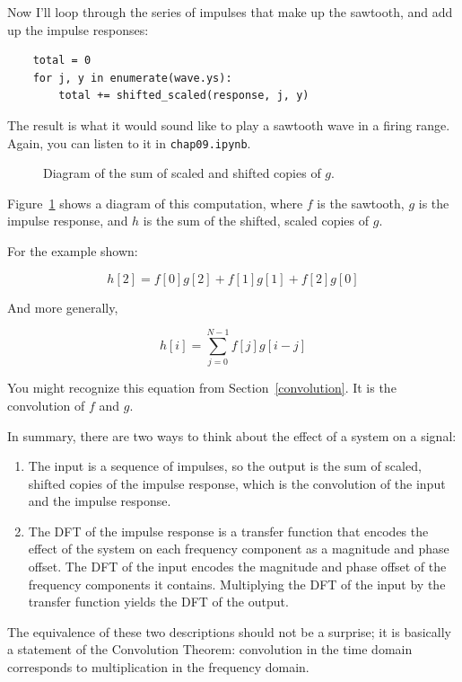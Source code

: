 \documentclass[12pt]{book}
\begin{document}
Now I'll loop through the series of impulses that make up the
sawtooth, and add up the impulse responses:

\begin{verbatim}
    total = 0
    for j, y in enumerate(wave.ys):
        total += shifted_scaled(response, j, y)
\end{verbatim}

The result is what it would sound like to play a sawtooth wave in a
firing range.  Again, you can listen to it in {\tt chap09.ipynb}.

\begin{figure}

\caption{Diagram of the sum of scaled and shifted copies of $g$.}
\label{fig.convolution}
\end{figure}

Figure~\ref{fig.convolution} shows a diagram of this computation,
where $f$ is the sawtooth, $g$ is the impulse response, and $h$
is the sum of the shifted, scaled copies of $g$.

For the example shown:

\[ h[2] = f[0]g[2] + f[1]g[1] + f[2]g[0]  \]

And more generally,

\[ h[i] = \sum_{j=0}^{N-1} f[j] g[i-j]  \]

You might recognize this equation from Section~\ref{convolution}.  It
is the convolution of $f$ and $g$.

In summary, there are two ways to think about the effect of a system
on a signal:

\begin{enumerate}

\item The input is a sequence of impulses, so the output is the sum of
  scaled, shifted copies of the impulse response, which is the
  convolution of the input and the impulse response.

\item The DFT of the impulse response is a transfer function that
  encodes the effect of the system on each frequency component as a
  magnitude and phase offset.  The DFT of the input encodes the
  magnitude and phase offset of the frequency components it contains.
  Multiplying the DFT of the input by the transfer function yields
  the DFT of the output.

\end{enumerate}

The equivalence of these two descriptions should not be a surprise;
it is basically a statement of the Convolution Theorem:
convolution in the time
domain corresponds to multiplication in the frequency domain.
\end{document}
